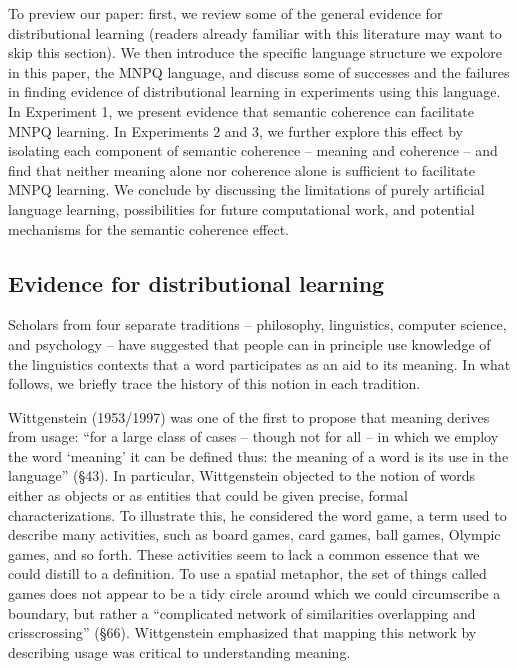 \documentclass[man,floatsintext]{apa6}
\begin{document}
To preview our paper: first, we review some of the general evidence for distributional learning (readers already familiar with this literature may want to skip this section). We then introduce the specific language structure we expolore in this paper, the MNPQ language, and discuss some of successes and the failures in finding evidence of distributional learning in experiments using this language. In Experiment 1, we present evidence that semantic coherence can facilitate MNPQ learning. In Experiments 2 and 3, we further explore this effect by isolating each component of semantic coherence -- meaning and coherence -- and find that neither meaning alone nor coherence alone is sufficient to facilitate MNPQ learning. We conclude by discussing the limitations of purely artificial language learning, possibilities for future computational work, and potential mechanisms for the semantic coherence effect.

\subsection{Evidence for distributional learning}

Scholars from four separate traditions -- philosophy, linguistics, computer science, and psychology -- have suggested that people can in principle use knowledge of the linguistics contexts that a word participates as an aid to its meaning. In what follows, we briefly trace the history of this notion in each tradition.

Wittgenstein (1953/1997) was one of the first to propose that meaning derives from usage: ``for a large class of cases -- though not for all -- in which we employ the word `meaning' it can be defined thus: the meaning of a word is its use in the language'' (\S 43). In particular, Wittgenstein objected to the notion of words either as objects or as entities that could be given precise, formal characterizations. To illustrate this, he considered the word game, a term used to describe many activities, such as board games, card games, ball games, Olympic games, and so forth. These activities seem to lack a common essence that we could distill to a definition. To use a spatial metaphor, the set of things called games does not appear to be a tidy circle around which we could circumscribe a boundary, but rather a ``complicated network of similarities overlapping and crisscrossing'' (\S 66). Wittgenstein emphasized that mapping this network by describing usage was critical to understanding meaning.
\end{document}
